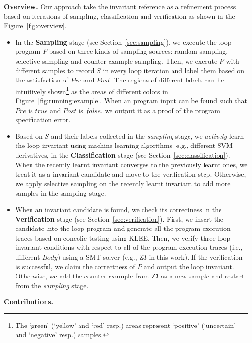 \medskip\noindent
\textbf{Overview.}
Our approach take the invariant reference as a refinement process 
based on iterations of sampling, classification and verification 
as shown in the Figure~\ref{fig:overview}. 
\begin{itemize}
    \item 
    In the \textbf{Sampling} stage (see Section~\ref{sec:sampling}), 
    we execute the loop program $P$ based on three kinds of sampling sources: 
    random sampling, selective sampling and counter-example sampling. 
    Then, we execute $P$ with different samples to record $S$ in every loop iteration 
    and label them based on the satisfaction of $\mathit{Pre}$ and $\mathit{Post}$. 
    The regions of different labels can be intuitively shown\footnote{
        The `green' (`yellow' and `red' resp.) areas 
        represent `positive' (`uncertain' and `negative' resp.) samples. 
    } as the areas of different colors in Figure~\ref{fig:running:example}. 
    When an program input can be found such that 
    $\mathit{Pre}$ is $\mathit{true}$ and $\mathit{Post}$ is $\mathit{false}$, 
    we output it as a proof of the program specification error. 
    \item 
    Based on $S$ and their labels collected in the \emph{sampling} stage, 
    we \emph{actively} learn the loop invariant using machine learning algorithms, 
    e.g., different SVM derivatives, in the \textbf{Classification} stage 
    (see Section~\ref{sec:classification}). 
    When the recently learnt invariant converges to the previously learnt ones, 
    we treat it as a invariant candidate and move to the verification step. 
    Otherwise, we apply selective sampling on the recently learnt invariant 
    to add more samples in the sampling stage. 
    \item 
    When an invariant candidate is found, 
    we check its correctness in the \textbf{Verification} stage (see Section~\ref{sec:verification}). 
    First, we insert the candidate into the loop program and generate all the program execution traces 
    based on concolic testing using KLEE. 
    Then, we verify three loop invariant conditions 
    with respect to all of the program execution traces (i.e., different $\mathit{Body}$) 
    using a SMT solver (e.g., Z3 in this work). 
    If the verification is successful, we claim the correctness of $P$ and output the loop invariant. 
    Otherwise, we add the counter-example from Z3 as a new sample 
    and restart from the \emph{sampling} stage. 
\end{itemize}

\medskip\noindent
\textbf{Contributions.}


